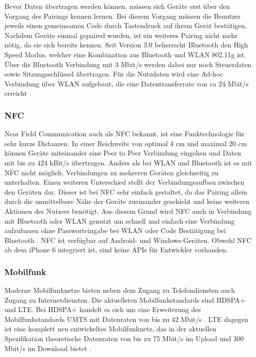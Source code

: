 Bevor Daten übertragen werden können, müssen sich Geräte erst über den Vorgang des Pairings kennen lernen. Bei diesem Vorgang müssen die Benutzer jeweils einen gemeinsamen Code durch Tastendruck auf ihrem Gerät bestätigen. Nachdem Geräte einmal gepaired wurden, ist ein weiteres Pairing nicht mehr nötig, da sie sich bereits kennen. Seit Version 3.0 beherrscht Bluetooth den High Speed Modus, welcher eine Kombination aus Bluetooth und \ac{WLAN} 802.11g ist. Über die Bluetooth Verbindung mit 3 Mbit/s werden dabei nur noch Steuerdaten sowie Sitzungsschlüssel übertragen. Für die Nutzdaten wird eine Ad-hoc Verbindung über \ac{WLAN} aufgebaut, die eine Datentransferrate von ca 24 Mbit/s erreicht \cite[55-57]{baun2012computernetze}.

\subsubsection{NFC} 
Near Field Communication auch als \ac{NFC} bekannt, ist eine Funktechnologie für sehr kurze Distanzen. In einer Reichweite von optimal 4 cm und maximal  20 cm können Geräte miteinander eine Peer to Peer Verbindung eingehen und Daten mit bis zu 424 kBit/s übertragen. Anders als bei \ac{WLAN} und Bluetooth ist es mit \ac{NFC} nicht möglich, Verbindungen zu mehreren Geräten gleichzeitig zu unterhalten. Einen weiteren Unterschied stellt der Verbindungsaufbau zwischen den Geräten dar. Dieser ist bei \ac{NFC} sehr einfach gestaltet, da das Pairing allein durch die unmittelbare Nähe der Geräte zueinander geschieht und keine weiteren Aktionen des Nutzers benötigt. Aus diesem Grund wird \ac{NFC} auch in Verbindung mit Bluetooth oder \ac{WLAN} genutzt um schnell und einfach eine Verbindung aufzubauen ohne Passworteingabe bei \ac{WLAN} oder Code Bestätigung bei Bluetooth \cite{agrawal2012near}. \ac{NFC} ist verfügbar auf Android- und Windows-Geräten. Obwohl \ac{NFC} ab dem iPhone 6 integriert ist, sind keine \acs{API}s für Entwickler vorhanden. 

\subsubsection{Mobilfunk}
Moderne Mobilfunknetze bieten neben dem Zugang zu Telefondiensten auch Zugang zu Internetdiensten. Die aktuellsten Mobilfunkstandards sind \ac{HDSPA+} und \ac{LTE}. Bei \ac{HDSPA+} handelt es sich um eine Erweiterung des Mobilfunkstandards \acs{UMTS} mit Datenraten von bis zu 42 Mbit/s \cite{HDSPA:Online}. \ac{LTE} dagegen ist eine komplett neu entwickeltes Mobilfunknetz, das in der aktuellen Spezifikation theoretische Datenraten von bis zu 75 Mbit/s im Upload und 300 Mbit/s im Download bietet \cite{LTE:Online}.

